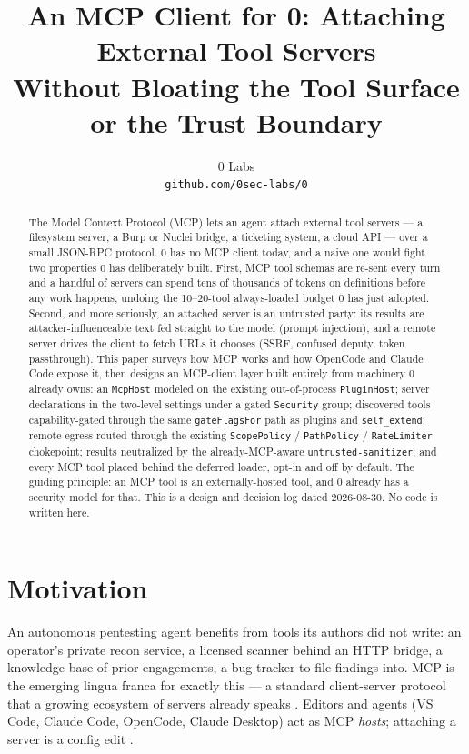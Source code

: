 \documentclass[11pt]{article}
\title{An MCP Client for 0: Attaching External Tool Servers\\
Without Bloating the Tool Surface or the Trust Boundary}
\author{
  0 Labs \\
  \texttt{github.com/0sec-labs/0}
}
\date{}
\begin{document}
\maketitle

\begin{abstract}
The Model Context Protocol (MCP) lets an agent attach external tool servers ---
a filesystem server, a Burp or Nuclei bridge, a ticketing system, a cloud API
--- over a small JSON-RPC protocol. 0 has no MCP client today, and a naive one
would fight two properties 0 has deliberately built. First, MCP tool schemas
are re-sent every turn and a handful of servers can spend tens of thousands of
tokens on definitions before any work happens, undoing the 10--20-tool
always-loaded budget 0 has just adopted. Second, and more seriously, an
attached server is an untrusted party: its results are attacker-influenceable
text fed straight to the model (prompt injection), and a remote server drives the
client to fetch URLs it chooses (SSRF, confused deputy, token passthrough). This
paper surveys how MCP works and how OpenCode and Claude Code expose it, then
designs an MCP-client layer built entirely from machinery 0 already owns: an
\texttt{McpHost} modeled on the existing out-of-process \texttt{PluginHost};
server declarations in the two-level settings under a gated \texttt{Security}
group; discovered tools capability-gated through the same
\texttt{gateFlagsFor} path as plugins and \texttt{self\_extend}; remote egress
routed through the existing \texttt{ScopePolicy} / \texttt{PathPolicy} /
\texttt{RateLimiter} chokepoint; results neutralized by the already-MCP-aware
\texttt{untrusted-sanitizer}; and every MCP tool placed behind the deferred
loader, opt-in and off by default. The guiding principle: an MCP tool is an
externally-hosted tool, and 0 already has a security model for that. This is a
design and decision log dated 2026-08-30. No code is written here.
\end{abstract}

\section{Motivation}

An autonomous pentesting agent benefits from tools its authors did not write:
an operator's private recon service, a licensed scanner behind an HTTP bridge,
a knowledge base of prior engagements, a bug-tracker to file findings into. MCP
is the emerging lingua franca for exactly this --- a standard client-server
protocol that a growing ecosystem of servers already speaks
\cite{mcp-arch}. Editors and agents (VS Code, Claude Code, OpenCode, Claude
Desktop) act as MCP \emph{hosts}; attaching a server is a config edit
\cite{mcp-arch,claudecode-mcp,opencode-mcp}.
\end{document}
